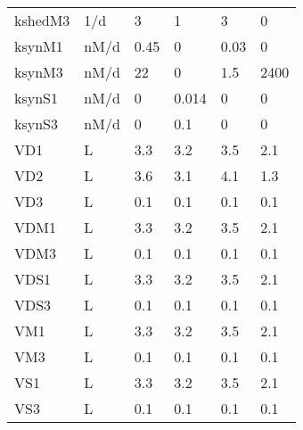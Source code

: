 \begin{tabular}{llllll}
  kshedM3 & 1/d & 3 & 1 & 3 & 0 \\ 
  ksynM1 & nM/d & 0.45 & 0 & 0.03 & 0 \\ 
  ksynM3 & nM/d & 22 & 0 & 1.5 & 2400 \\ 
  ksynS1 & nM/d & 0 & 0.014 & 0 & 0 \\ 
  ksynS3 & nM/d & 0 & 0.1 & 0 & 0 \\ 
  VD1 & L & 3.3 & 3.2 & 3.5 & 2.1 \\ 
  VD2 & L & 3.6 & 3.1 & 4.1 & 1.3 \\ 
  VD3 & L & 0.1 & 0.1 & 0.1 & 0.1 \\ 
  VDM1 & L & 3.3 & 3.2 & 3.5 & 2.1 \\ 
  VDM3 & L & 0.1 & 0.1 & 0.1 & 0.1 \\ 
  VDS1 & L & 3.3 & 3.2 & 3.5 & 2.1 \\ 
  VDS3 & L & 0.1 & 0.1 & 0.1 & 0.1 \\ 
  VM1 & L & 3.3 & 3.2 & 3.5 & 2.1 \\ 
  VM3 & L & 0.1 & 0.1 & 0.1 & 0.1 \\ 
  VS1 & L & 3.3 & 3.2 & 3.5 & 2.1 \\ 
  VS3 & L & 0.1 & 0.1 & 0.1 & 0.1 \\ 
   \hline
\end{tabular}
